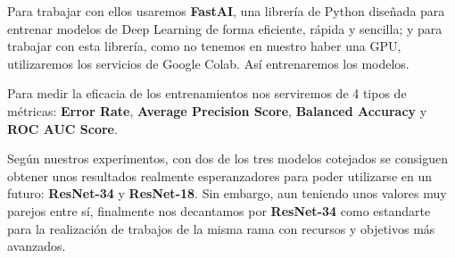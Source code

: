 Para trabajar con ellos usaremos \textbf{FastAI}, una librería de Python diseñada para entrenar modelos de Deep Learning de forma eficiente, rápida y sencilla; y para trabajar con esta librería, como no tenemos en nuestro haber una \ac{GPU}, utilizaremos los servicios de Google Colab. Así entrenaremos los modelos.

Para medir la eficacia de los entrenamientos nos serviremos de 4 tipos de métricas: \textbf{Error Rate}, \textbf{Average Precision Score}, \textbf{Balanced Accuracy} y \textbf{ROC AUC Score}.

Según nuestros experimentos, con dos de los tres modelos cotejados se consiguen obtener unos resultados realmente esperanzadores para poder utilizarse en un futuro: \textbf{ResNet-34} y \textbf{ResNet-18}. Sin embargo, aun teniendo unos valores muy parejos entre sí, finalmente nos decantamos por \textbf{ResNet-34} como estandarte para la realización de trabajos de la misma rama con recursos y objetivos más avanzados.


